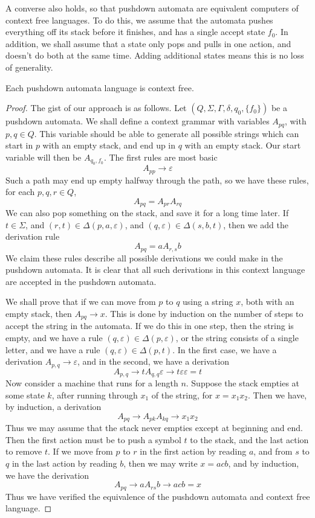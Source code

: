 A converse also holds, so that pushdown automata are equivalent computers of context free languages. To do this, we assume that the automata pushes everything off its stack before it finishes, and has a single accept state $f_0$. In addition, we shall assume that a state only pops and pulls in one action, and doesn't do both at the same time. Adding additional states means this is no loss of generality.

\begin{theorem}
    Each pushdown automata language is context free.
\end{theorem}
\begin{proof}
    The gist of our approach is as follows. Let $(Q, \Sigma, \Gamma, \delta, q_0, \{ f_0 \})$ be a pushdown automata. We shall define a context grammar with variables $A_{pq}$, with $p,q \in Q$. This variable should be able to generate all possible strings which can start in $p$ with an empty stack, and end up in $q$ with an empty stack. Our start variable will then be $A_{q_0, f_0}$. The first rules are most basic
    \[ A_{pp} \rightarrow \varepsilon \]
    Such a path may end up empty halfway through the path, so we have these rules, for each $p,q,r \in Q$,
    \[ A_{pq} = A_{pr} A_{rq} \]
    We can also pop something on the stack, and save it for a long time later. If $t \in \Sigma$, and $(r, t) \in \Delta(p, a, \varepsilon)$, and $(q, \varepsilon) \in \Delta(s, b, t)$, then we add the derivation rule
    \[ A_{pq} = a A_{r,s} b \]
    We claim these rules describe all possible derivations we could make in the pushdown automata. It is clear that all such derivations in this context language are accepted in the pushdown automata.

    We shall prove that if we can move from $p$ to $q$ using a string $x$, both with an empty stack, then $A_{pq} \rightarrow x$. This is done by induction on the number of steps to accept the string in the automata. If we do this in one step, then the string is empty, and we have a rule $(q, \varepsilon) \in \Delta(p, \varepsilon)$, or the string consists of a single letter, and we have a rule $(q, \varepsilon) \in \Delta(p, t)$. In the first case, we have a derivation $A_{p, q} \rightarrow \varepsilon$, and in the second, we have a derivation
    \[ A_{p,q} \rightarrow t A_{q,q} \varepsilon \rightarrow t \varepsilon \varepsilon = t \]
    Now consider a machine that runs for a length $n$. Suppose the stack empties at some state $k$, after running through $x_1$ of the string, for $x = x_1 x_2$. Then we have, by induction, a derivation
    \[ A_{pq} \rightarrow A_{pk} A_{kq} \rightarrow x_1 x_2 \]
    Thus we may assume that the stack never empties except at beginning and end. Then the first action must be to push a symbol $t$ to the stack, and the last action to remove $t$. If we move from $p$ to $r$ in the first action by reading $a$, and from $s$ to $q$ in the last action by reading $b$, then we may write $x = acb$, and by induction, we have the derivation
    \[ A_{pq} \rightarrow a A_{rs} b \rightarrow acb = x  \]
    Thus we have verified the equivalence of the pushdown automata and context free language.
\end{proof}

